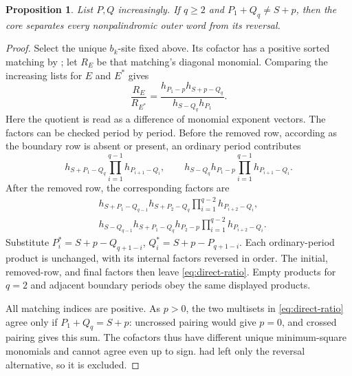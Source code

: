 \documentclass[11pt,a4paper]{amsart}
\numberwithin{equation}{section}
\theoremstyle{plain}
\newtheorem{proposition}[theorem]{Proposition}
\theoremstyle{definition}
\begin{document}
\begin{proposition}\label{prop:direct-cofactor}
List \(P,Q\) increasingly.  If \(q\ge2\) and \(P_1+Q_q\ne S+p\), then the core separates every nonpalindromic outer word from its reversal.
\end{proposition}
\begin{proof}
Select the unique \(b_k\)-site fixed above.  Its cofactor has a positive sorted matching by ; let \(R_E\) be that matching's diagonal monomial.  Comparing the increasing lists for \(E\) and \(E^*\) gives
\begin{equation}\label{eq:direct-ratio}
 \frac{R_E}{R_{E^*}}
 =\frac{h_{P_1-p}h_{S+p-Q_q}}{h_{S-Q_q}h_{P_1}}.
\end{equation}
Here the quotient is read as a difference of monomial exponent vectors.  The factors can be checked period by period.  Before the removed row, according as the boundary row is absent or present, an ordinary period contributes
\[
 h_{S+P_1-Q_q}\prod_{i=1}^{q-1}h_{P_{i+1}-Q_i},\qquad
 h_{S-Q_q}h_{P_1-p}\prod_{i=1}^{q-1}h_{P_{i+1}-Q_i}.
\]
After the removed row, the corresponding factors are
\[
 \begin{aligned}
 &h_{S+P_1-Q_{q-1}}h_{S+P_2-Q_q}
       \prod_{i=1}^{q-2}h_{P_{i+2}-Q_i},\\
 &h_{S-Q_{q-1}}h_{S+P_1-Q_q}h_{P_2-p}
       \prod_{i=1}^{q-2}h_{P_{i+2}-Q_i}.
 \end{aligned}
\]
Substitute \(P_i^*=S+p-Q_{q+1-i}\), \(Q_i^*=S+p-P_{q+1-i}\).  Each ordinary-period product is unchanged, with its internal factors reversed in order.  The initial, removed-row, and final factors then leave \eqref{eq:direct-ratio}.  Empty products for \(q=2\) and adjacent boundary periods obey the same displayed products.

All matching indices are positive.  As \(p>0\), the two multisets in \eqref{eq:direct-ratio} agree only if \(P_1+Q_q=S+p\): uncrossed pairing would give \(p=0\), and crossed pairing gives this sum.  The cofactors thus have different unique minimum-square monomials and cannot agree even up to sign.   had left only the reversal alternative, so it is excluded.
\end{proof}
\end{document}
